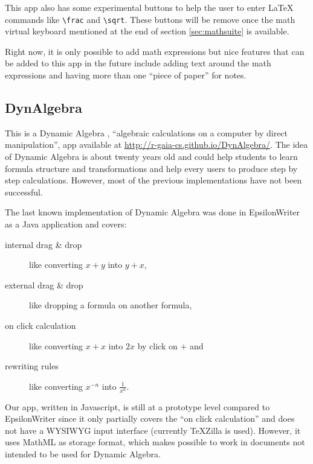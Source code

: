 This app also has some experimental buttons to help the user to enter LaTeX
commands like
{\tt \textbackslash frac} and {\tt \textbackslash sqrt}. These buttons will be
remove once the math virtual keyboard mentioned at the end of section
\ref{sec:mathsuite} is available.

Right now, it is only possible to add math expressions but nice features that can be
added to this app in the future include adding text around the math expressions and
having more than one ``piece of paper'' for notes.

\subsection{DynAlgebra}

This is a Dynamic Algebra \cite{Nicaud1}, ``algebraic calculations
on a computer by direct manipulation'', app available at
\href{http://r-gaia-cs.github.io/DynAlgebra/}{http://r-gaia-cs.github.io/DynAlgebra/}.
The idea of Dynamic Algebra is about twenty years old and could help
students to learn formula structure and transformations and help every users to
produce step by step calculations. However, most of the previous implementations
have not been successful.

The last known implementation of Dynamic Algebra was done in EpsilonWriter
\cite{Nicaud2} as a Java application and covers:
\begin{description}
  \item[internal drag \& drop] like converting $x + y$ into $y + x$,
  \item[external drag \& drop] like dropping a formula on another formula,
  \item[on click calculation] like converting $x + x$ into $2 x$ by click on $+$ and
  \item[rewriting rules] like converting $x^{-n}$ into $\frac{1}{x^n}$.
\end{description}

Our app, written in Javascript, is still at a prototype level compared
to EpsilonWriter since it only partially
covers the ``on click calculation'' and does not have a WYSIWYG input interface
(currently TeXZilla is used). However, it uses MathML as storage format,
which makes possible to work in documents not intended to be used for
Dynamic Algebra.
